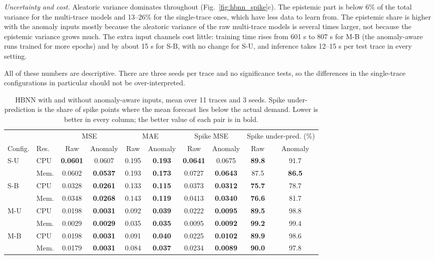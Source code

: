 \documentclass[conference]{IEEEtran}
\begin{document}
\textit{Uncertainty and cost.}
Aleatoric variance dominates throughout (Fig.~\ref{fig:hbnn_spike}c). The epistemic part is below 6\% of the total variance for the multi-trace models and 13--26\% for the single-trace ones, which have less data to learn from. The epistemic share is higher with the anomaly inputs mostly because the aleatoric variance of the raw multi-trace models is several times larger, not because the epistemic variance grows much. The extra input channels cost little: training time rises from 601 s to 807 s for M-B (the anomaly-aware runs trained for more epochs) and by about 15 s for S-B, with no change for S-U, and inference takes 12--15 s per test trace in every setting.

All of these numbers are descriptive. There are three seeds per trace and no significance tests, so the differences in the single-trace configurations in particular should not be over-interpreted.

\begin{table}[!t]
\caption{HBNN with and without anomaly-aware inputs, mean over 11 traces and 3 seeds. Spike under-prediction is the share of spike points where the mean forecast lies below the actual demand. Lower is better in every column; the better value of each pair is in bold.}
\label{tab:hbnn_acc}
\centering
\footnotesize
\setlength{\tabcolsep}{4.5pt}
\begin{tabular}{llcccccccc}
\toprule
 & & \multicolumn{2}{c}{MSE} & \multicolumn{2}{c}{MAE} & \multicolumn{2}{c}{Spike MSE} & \multicolumn{2}{c}{Spike under-pred. (\%)}\\
\cmidrule(lr){3-4}\cmidrule(lr){5-6}\cmidrule(lr){7-8}\cmidrule(lr){9-10}
Config. & Res. & Raw & Anomaly & Raw & Anomaly & Raw & Anomaly & Raw & Anomaly\\
\midrule
S-U & CPU & \textbf{0.0601} & 0.0607 & 0.195 & \textbf{0.193} & \textbf{0.0641} & 0.0675 & \textbf{89.8} & 91.7\\
 & Mem. & 0.0602 & \textbf{0.0537} & 0.193 & \textbf{0.173} & 0.0727 & \textbf{0.0643} & 87.5 & \textbf{86.5}\\
\addlinespace[2pt]
S-B & CPU & 0.0328 & \textbf{0.0261} & 0.133 & \textbf{0.115} & 0.0373 & \textbf{0.0312} & \textbf{75.7} & 78.7\\
 & Mem. & 0.0348 & \textbf{0.0268} & 0.143 & \textbf{0.119} & 0.0413 & \textbf{0.0340} & \textbf{76.6} & 81.7\\
\addlinespace[2pt]
M-U & CPU & 0.0198 & \textbf{0.0031} & 0.092 & \textbf{0.039} & 0.0222 & \textbf{0.0095} & \textbf{89.5} & 98.8\\
 & Mem. & 0.0029 & \textbf{0.0029} & 0.035 & \textbf{0.035} & 0.0095 & \textbf{0.0092} & \textbf{99.2} & 99.4\\
\addlinespace[2pt]
M-B & CPU & 0.0198 & \textbf{0.0031} & 0.091 & \textbf{0.040} & 0.0225 & \textbf{0.0102} & \textbf{89.9} & 98.6\\
 & Mem. & 0.0179 & \textbf{0.0031} & 0.084 & \textbf{0.037} & 0.0234 & \textbf{0.0089} & \textbf{90.0} & 97.8\\
\bottomrule
\end{tabular}
\end{table}
\end{document}
